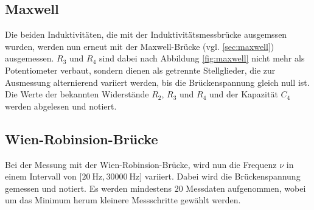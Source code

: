 \subsection{Maxwell}
\label{sec:durch-maxwell}
Die beiden Induktivitäten, die mit der Induktivitätsmessbrücke ausgemssen wurden, werden nun erneut mit der Maxwell-Brücke 
(vgl. \ref{sec:maxwell}) ausgemessen. $R_3$ und $R_4$ sind dabei nach Abbildung \ref{fig:maxwell} nicht mehr als Potentiometer
verbaut, sondern dienen als getrennte Stellglieder, die zur Ausmessung alternierend variiert werden, bis die Brückenspannung 
gleich null ist. 
Die Werte der bekannten Widerstände $R_2$, $R_3$ und $R_4$ und der Kapazität $C_4$ werden abgelesen und notiert. 

\subsection{Wien-Robinsion-Brücke}
\label{sec:durch-wien-robinson}
Bei der Messung mit der Wien-Robinsion-Brücke, wird nun die Frequenz $\nu$ in einem Intervall von $[\SI{20}{\hertz}, \SI{30000}{\hertz]}$ 
variiert. Dabei wird die Brückenspannung gemessen und notiert. Es werden mindestens $20$ Messdaten aufgenommen, wobei um das Minimum 
herum kleinere Messschritte gewählt werden. 